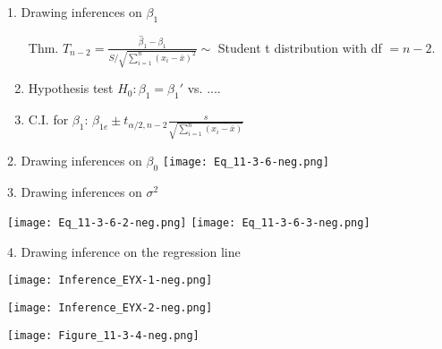 \begin{frame}{1. Drawing inferences on $\beta_1$}
\begin{enumerate}
\item[Thm.]  $\displaystyle T_{n-2} = \frac{\hat\beta_1 - \beta_1}{S\bigg/\sqrt{\sum_{i=1}^n (x_i-\bar x)^2}}\sim $ Student t distribution with df $=n-2$.
\vfill
\item Hypothesis test $H_0:\beta_1=\beta_1'$ vs. ....\\[2em]
\item C.I. for $\beta_1$: \quad $\beta_{1e}\pm t_{\alpha/2,n-2} \frac{s}{\sqrt{\sum_{i=1}^n (x_i-\bar x)}}$
\end{enumerate}
\end{frame}
\begin{frame}{2. Drawing inferences on $\beta_0$}
	\centering
	\texttt{[image: Eq\_11-3-6-neg.png]}
\end{frame}
\begin{frame}{3. Drawing inferences on $\sigma^2$}

	\centering
	\texttt{[image: Eq\_11-3-6-2-neg.png]}
	\texttt{[image: Eq\_11-3-6-3-neg.png]}
\end{frame}
\begin{frame}{4. Drawing inference on the regression line}

	\centering
	\texttt{[image: Inference\_EYX-1-neg.png]}
\end{frame}
\begin{frame}

	\centering
	\texttt{[image: Inference\_EYX-2-neg.png]}
\end{frame}
\begin{frame}
	\centering
	\texttt{[image: Figure\_11-3-4-neg.png]}
\end{frame}
